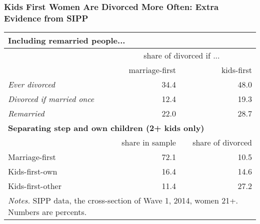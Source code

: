 \documentclass[aspectratio=169]{beamer}
\begin{document}
\begin{frame}
\frametitle{Kids First Women Are Divorced More Often: Extra Evidence from SIPP}
\begin{center}
\begin{tabular}{l r r }
\hline
\multicolumn{3}{l}{\textbf{Including remarried people...}} \\\hline
& \multicolumn{2}{c}{share of divorced if ... }  \\
&  marriage-first & kids-first   \\\hline
\textit{Ever divorced} & 34.4 & 48.0  \\
\textit{Divorced if married once} &  12.4 & 19.3 \\
\textit{Remarried} &  22.0 & 28.7 \\\hline
\hline
\multicolumn{3}{l}{\textbf{Separating step and own children (2+ kids only)}} \\\hline
& share in sample & share of divorced   \\\hline
{Marriage-first} & 72.1 & 10.5 \\
{Kids-first-own} &  16.4 & 14.6 \\
{Kids-first-other} &  11.4 & 27.2 \\\hline
\multicolumn{3}{p{0.7\linewidth}}{\footnotesize \textit{Notes.} SIPP data, the cross-section of Wave 1, 2014, women 21+. Numbers are percents.}\\\hline\hline
\end{tabular}
\end{center}
\end{frame}
\end{document}
